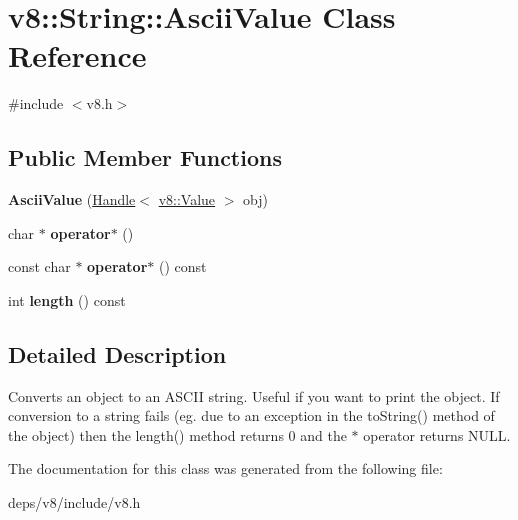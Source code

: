 \hypertarget{classv8_1_1_string_1_1_ascii_value}{}\section{v8\+:\+:String\+:\+:Ascii\+Value Class Reference}
\label{classv8_1_1_string_1_1_ascii_value}


{\ttfamily \#include $<$v8.\+h$>$}

\subsection*{Public Member Functions}
\begin{DoxyCompactItemize}
\item 
\hypertarget{classv8_1_1_string_1_1_ascii_value_a57cc7956658fe389a7232d4843caf3d0}{}{\bfseries Ascii\+Value} (\hyperlink{classv8_1_1_handle}{Handle}$<$ \hyperlink{classv8_1_1_value}{v8\+::\+Value} $>$ obj)\label{classv8_1_1_string_1_1_ascii_value_a57cc7956658fe389a7232d4843caf3d0}

\item 
\hypertarget{classv8_1_1_string_1_1_ascii_value_a1e08f3a11aefee28cbbcbc386afd6032}{}char $\ast$ {\bfseries operator$\ast$} ()\label{classv8_1_1_string_1_1_ascii_value_a1e08f3a11aefee28cbbcbc386afd6032}

\item 
\hypertarget{classv8_1_1_string_1_1_ascii_value_abb007f038d674706da738f1f1f01f084}{}const char $\ast$ {\bfseries operator$\ast$} () const \label{classv8_1_1_string_1_1_ascii_value_abb007f038d674706da738f1f1f01f084}

\item 
\hypertarget{classv8_1_1_string_1_1_ascii_value_a97cccf0ed40a3deda1612c235b2f8068}{}int {\bfseries length} () const \label{classv8_1_1_string_1_1_ascii_value_a97cccf0ed40a3deda1612c235b2f8068}

\end{DoxyCompactItemize}


\subsection{Detailed Description}
Converts an object to an A\+S\+C\+I\+I string. Useful if you want to print the object. If conversion to a string fails (eg. due to an exception in the to\+String() method of the object) then the length() method returns 0 and the $\ast$ operator returns N\+U\+L\+L. 

The documentation for this class was generated from the following file\+:\begin{DoxyCompactItemize}
\item 
deps/v8/include/v8.\+h\end{DoxyCompactItemize}
